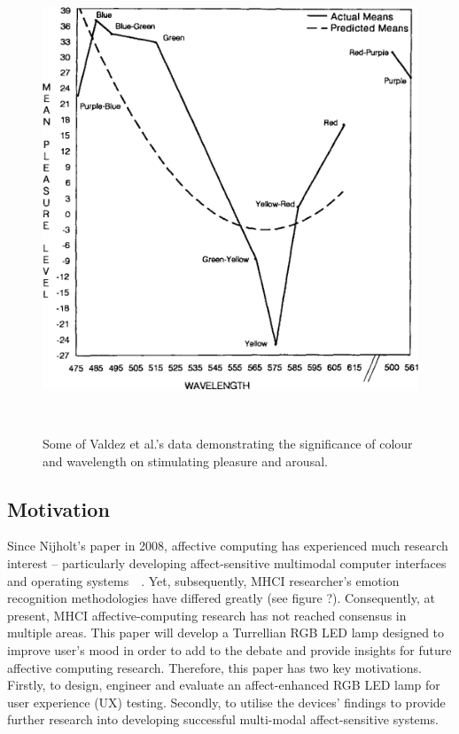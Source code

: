 \documentclass{sigchi}
\begin{document}
\begin{figure}
\centering
  \includegraphics[width=0.9\columnwidth]{figures/Valdez}
  \caption{Some of Valdez et al.'s data demonstrating the significance of colour and wavelength on stimulating pleasure and arousal.}~\cite{valdez1994effects}~\label{fig:figure1}
\end{figure}


\subsection{Motivation}

Since Nijholt’s paper in 2008, affective computing has experienced much research interest – particularly developing affect-sensitive multimodal computer interfaces and operating systems~\cite{pantic2008human}~\cite{5771346}. Yet, subsequently, MHCI researcher’s emotion recognition methodologies have differed greatly (see figure ?). Consequently, at present, MHCI affective-computing research has not reached consensus in multiple areas. This paper will develop a Turrellian RGB LED lamp designed to improve user’s mood in order to add to the debate and provide insights for future affective computing research. Therefore, this paper has two key motivations. Firstly, to design, engineer and evaluate an affect-enhanced RGB LED lamp for user experience (UX) testing. Secondly, to utilise the devices’ findings to provide further research into developing successful multi-modal affect-sensitive systems.
\end{document}
